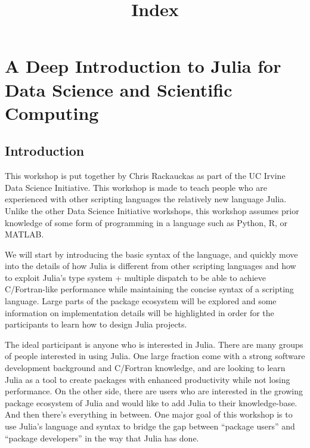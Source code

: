 \documentclass[11pt]{article}
\title{Index}
\begin{document}
    
    
    \maketitle
    
    

    
    \section{A Deep Introduction to Julia for Data Science and Scientific
Computing}\label{a-deep-introduction-to-julia-for-data-science-and-scientific-computing}

    \subsection{Introduction}\label{introduction}

This workshop is put together by Chris Rackauckas as part of the UC
Irvine Data Science Initiative. This workshop is made to teach people
who are experienced with other scripting languages the relatively new
language Julia. Unlike the other Data Science Initiative workshops, this
workshop assumes prior knowledge of some form of programming in a
language such as Python, R, or MATLAB.

We will start by introducing the basic syntax of the language, and
quickly move into the details of how Julia is different from other
scripting languages and how to exploit Julia's type system + multiple
dispatch to be able to achieve C/Fortran-like performance while
maintaining the concise syntax of a scripting language. Large parts of
the package ecosystem will be explored and some information on
implementation details will be highlighted in order for the participants
to learn how to design Julia projects.

The ideal participant is anyone who is interested in Julia. There are
many groups of people interested in using Julia. One large fraction come
with a strong software development background and C/Fortran knowledge,
and are looking to learn Julia as a tool to create packages with
enhanced productivity while not losing performance. On the other side,
there are users who are interested in the growing package ecosystem of
Julia and would like to add Julia to their knowledge-base. And then
there's everything in between. One major goal of this workshop is to use
Julia's language and syntax to bridge the gap between ``package users''
and ``package developers'' in the way that Julia has done.
\end{document}

